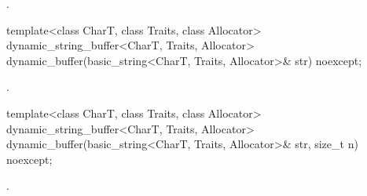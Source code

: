 \begin{itemdescr}
\pnum
\returns {}.
\end{itemdescr}

\begin{itemdecl}
template<class CharT, class Traits, class Allocator>
  dynamic_string_buffer<CharT, Traits, Allocator>
  dynamic_buffer(basic_string<CharT, Traits, Allocator>& str) noexcept;
\end{itemdecl}

\begin{itemdescr}
\pnum
\returns {}.
\end{itemdescr}

\begin{itemdecl}
template<class CharT, class Traits, class Allocator>
  dynamic_string_buffer<CharT, Traits, Allocator>
  dynamic_buffer(basic_string<CharT, Traits, Allocator>& str, size_t n) noexcept;
\end{itemdecl}

\begin{itemdescr}
\pnum
\returns {}.
\end{itemdescr}



